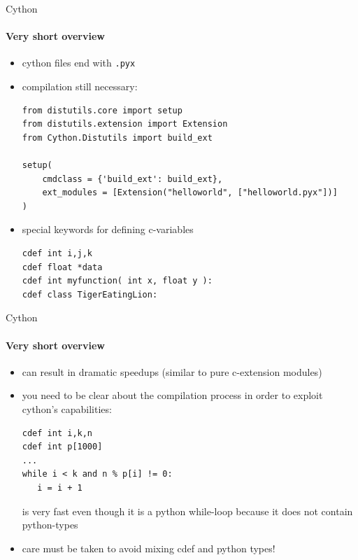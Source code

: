 \documentclass[german]{beamer}
\newcommand{\ra}{\text{$\rightarrow$}}
\begin{document}
\begin{frame}[fragile]{Cython}
  \framesubtitle{Very short overview}
  \begin{itemize}
  \item cython files end with {\tt .pyx}
  \item compilation still necessary:
\begin{lstlisting}[caption=setup.py,basicstyle=\tiny]
from distutils.core import setup
from distutils.extension import Extension
from Cython.Distutils import build_ext

setup(
    cmdclass = {'build_ext': build_ext},
    ext_modules = [Extension("helloworld", ["helloworld.pyx"])]
)
\end{lstlisting}
\item special keywords for defining c-variables
\begin{lstlisting}
cdef int i,j,k
cdef float *data
cdef int myfunction( int x, float y ):
cdef class TigerEatingLion:
\end{lstlisting}
  \end{itemize}
\end{frame}

\begin{frame}[fragile]{Cython}
  \framesubtitle{Very short overview}
  \begin{itemize}
  \item can result in dramatic speedups (similar to pure c-extension
    modules)
  \item you need to be clear about the compilation process in order to
    exploit cython's capabilities:
    \begin{lstlisting}
cdef int i,k,n
cdef int p[1000]
...
while i < k and n % p[i] != 0:
   i = i + 1
    \end{lstlisting}
    is very fast even though it is a python while-loop because it does
    not contain python-types
  \item[\ra] care must be taken to avoid mixing cdef and python types!
  \end{itemize}
\end{frame}
\end{document}
